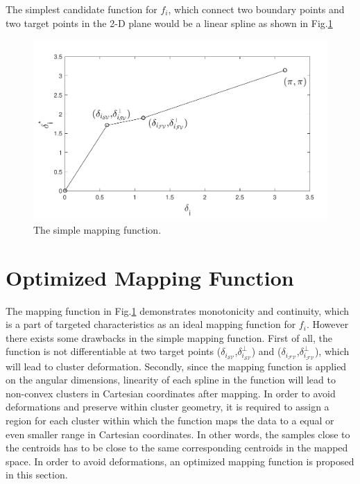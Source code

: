 The simplest candidate function for $f_i$, which connect two boundary points and two target points in the 2-D plane would be a linear spline as shown in Fig.\ref{fig:simple_spline}

\begin{figure}[t]
\centering
\includegraphics[scale=0.7]{Fig/simple_spline1.pdf}
\caption{The simple mapping function.}
\label{fig:simple_spline}
\end{figure}

\section{Optimized Mapping Function}

The mapping function in Fig.\ref{fig:simple_spline} demonstrates monotonicity and continuity, which is a part of targeted characteristics as an ideal mapping function for $f_i$. However there exists some drawbacks in the simple mapping function. First of all, the function is not differentiable at two target points ($\delta_{i_{{\mathcal{SV}}}}$,$\delta^{\perp}_{i_{{\mathcal{SV}}}}$) and ($\delta_{i_{{\mathcal{FV}}}}$,$\delta^{\perp}_{i_{{\mathcal{FV}}}}$), which will lead to cluster deformation. Secondly, since the mapping function is applied on the angular dimensions, linearity of each spline in the function will lead to non-convex clusters in Cartesian coordinates after mapping. In order to avoid deformations and preserve within cluster geometry, it is required to assign a region for each cluster within which the function maps the data to a equal or even smaller range in Cartesian coordinates. In other words, the samples close to the centroids has to be close to the same corresponding centroids in the mapped space. In order to avoid deformations, an optimized mapping function is proposed in this section.

